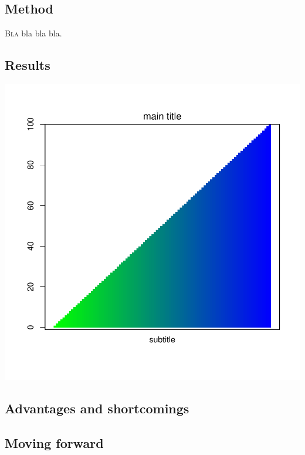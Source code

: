 \documentclass[11pt]{article}
\begin{document}
\begin{multicols}{2} 

\subsection*{Method}

\lettrine[nindent=0em,lines=3]{B}{la} bla bla bla.\cite{Cottler2014} \blindtext 

\subsection*{Results}
\blindtext

\begin{center}
\includegraphics{uganda_weather_first_pass-002}
\end{center}

\subsection*{Advantages and shortcomings}
\blindtext

\subsection*{Moving forward}
\blindtext




\end{multicols}
\newpage


\end{document}

